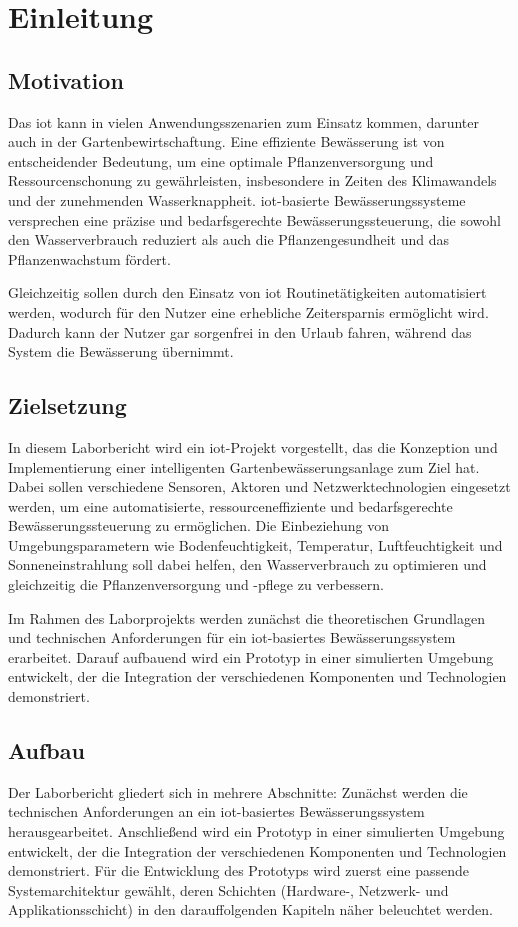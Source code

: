 
\section{Einleitung}

\subsection{Motivation}
Das \gls{iot} kann in vielen Anwendungsszenarien zum Einsatz kommen, darunter auch in der Gartenbewirtschaftung. Eine effiziente Bewässerung ist von entscheidender Bedeutung, um eine optimale Pflanzenversorgung und Ressourcenschonung zu gewährleisten, insbesondere in Zeiten des Klimawandels und der zunehmenden Wasserknappheit. \gls{iot}-basierte Bewässerungssysteme versprechen eine präzise und bedarfsgerechte Bewässerungssteuerung, die sowohl den Wasserverbrauch reduziert als auch die Pflanzengesundheit und das Pflanzenwachstum fördert.

Gleichzeitig sollen durch den Einsatz von \gls{iot} Routinetätigkeiten automatisiert werden, wodurch für den Nutzer eine erhebliche Zeitersparnis ermöglicht wird.
Dadurch kann der Nutzer gar sorgenfrei in den Urlaub fahren, während das System die Bewässerung übernimmt.

\subsection{Zielsetzung}

In diesem Laborbericht wird ein \gls{iot}-Projekt vorgestellt, das die Konzeption und Implementierung einer intelligenten Gartenbewässerungsanlage zum Ziel hat. Dabei sollen verschiedene Sensoren, Aktoren und Netzwerktechnologien eingesetzt werden, um eine automatisierte, ressourceneffiziente und bedarfsgerechte Bewässerungssteuerung zu ermöglichen. Die Einbeziehung von Umgebungsparametern wie Bodenfeuchtigkeit, Temperatur, Luftfeuchtigkeit und Sonneneinstrahlung soll dabei helfen, den Wasserverbrauch zu optimieren und gleichzeitig die Pflanzenversorgung und -pflege zu verbessern.

Im Rahmen des Laborprojekts werden zunächst die theoretischen Grundlagen und technischen Anforderungen für ein \gls{iot}-basiertes Bewässerungssystem erarbeitet. Darauf aufbauend wird ein Prototyp in einer simulierten Umgebung entwickelt, der die Integration der verschiedenen Komponenten und Technologien demonstriert.

\subsection{Aufbau}

Der Laborbericht gliedert sich in mehrere Abschnitte: Zunächst werden die technischen Anforderungen an ein \gls{iot}-basiertes Bewässerungssystem herausgearbeitet. Anschließend wird ein Prototyp in einer simulierten Umgebung entwickelt, der die Integration der verschiedenen Komponenten und Technologien demonstriert. Für die Entwicklung des Prototyps wird zuerst eine passende Systemarchitektur gewählt, deren Schichten (Hardware-, Netzwerk- und Applikationsschicht) in den darauffolgenden Kapiteln näher beleuchtet werden.